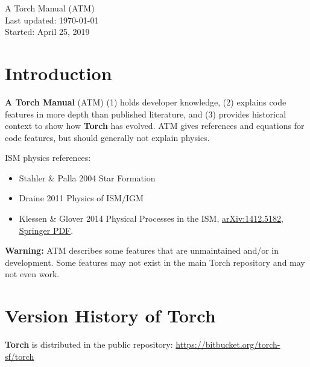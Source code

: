\documentclass[10pt]{article}
\begin{document}
\begin{center}
A Torch Manual (ATM) \\
Last updated: \today \\
Started: April 25, 2019
\end{center}

\tableofcontents
\newpage

\section{Introduction}

\textbf{A Torch Manual} (ATM) (1) holds developer knowledge, (2) explains code
features in more depth than published literature, and (3) provides historical
context to show how \textbf{Torch} has evolved.  ATM gives references and
equations for code features, but should generally not explain physics.

ISM physics references:
\begin{itemize}
    \item Stahler \& Palla 2004 Star Formation
    \item Draine 2011 Physics of ISM/IGM
    \item Klessen \& Glover 2014 Physical Processes in the ISM,
        \href{https://arxiv.org/abs/1412.5182}{arXiv:1412.5182},
        \href{https://link.springer.com/chapter/10.1007\%2F978-3-662-47890-5\_2}{Springer PDF}.
\end{itemize}

\textbf{Warning:} ATM describes some features that are unmaintained and/or in
development.  Some features may not exist in the main Torch repository and may
not even work.

\section{Version History of Torch}

\textbf{Torch} is distributed in the public repository:
\url{https://bitbucket.org/torch-sf/torch}
\end{document}
